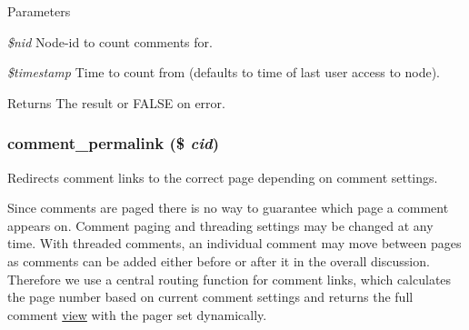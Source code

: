 \begin{DoxyParams}{Parameters}
\item[{\em \$nid}]Node-\/id to count comments for. \item[{\em \$timestamp}]Time to count from (defaults to time of last user access to node). \end{DoxyParams}
\begin{DoxyReturn}{Returns}
The result or FALSE on error. 
\end{DoxyReturn}
\hypertarget{comment_8module_a2d3e88d7b6cb088dcc526dbb88fd9460}{
\subsubsection[{comment\_\-permalink}]{\setlength{\rightskip}{0pt plus 5cm}comment\_\-permalink (\$ {\em cid})}}
\label{comment_8module_a2d3e88d7b6cb088dcc526dbb88fd9460}
Redirects comment links to the correct page depending on comment settings.

Since comments are paged there is no way to guarantee which page a comment appears on. Comment paging and threading settings may be changed at any time. With threaded comments, an individual comment may move between pages as comments can be added either before or after it in the overall discussion. Therefore we use a central routing function for comment links, which calculates the page number based on current comment settings and returns the full comment \hyperlink{classview}{view} with the pager set dynamically.


